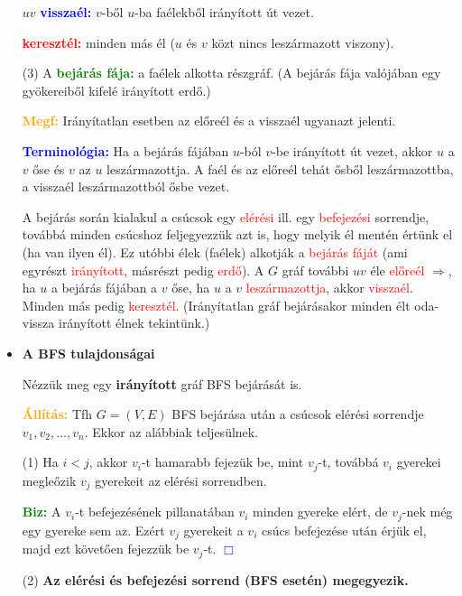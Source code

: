 \documentclass[../../szobeli.tex]{subfiles}
\begin{document}
\begin{itemize}
			$uv$ \textbf{\textcolor{blue}{visszaél:}} $v$-ből $u$-ba faélekből irányított út vezet.

			\textbf{\textcolor{red}{keresztél:}} minden más él ($u$ és $v$ közt nincs leszármazott viszony).

			(3) A \textbf{\textcolor{green}{bejárás fája:}} a faélek alkotta részgráf. (A bejárás fája valójában egy gyökereiből kifelé irányított erdő.)

			\textbf{\textcolor{orange}{Megf:}} Irányítatlan esetben az előreél és a visszaél ugyanazt jelenti.

			\textbf{\textcolor{blue}{Terminológia:}} Ha a bejárás fájában $u$-ból $v$-be irányított út vezet, akkor $u$ a $v$ őse és $v$ az $u$ leszármazottja. A faél és az előreél tehát ősből leszármazottba, a visszaél leszármazottból ősbe vezet.
            
            A bejárás során kialakul a csúcsok egy \textcolor{red}{elérési} ill. egy \textcolor{red}{befejezési} sorrendje, továbbá minden csúcshoz feljegyezzük azt is, hogy melyik él mentén értünk el (ha van ilyen él). Ez utóbbi élek ({faélek}) alkotják a \textcolor{red}{bejárás fáját} (ami egyrészt \textcolor{red}{irányított}, másrészt pedig \textcolor{red}{erdő}). A $G$ gráf további $uv$ éle \textcolor{red}{előreél} $\Rightarrow$, ha $u$ a bejárás fájában a $v$ őse, ha $u$ a $v$ \textcolor{red}{leszármazottja}, akkor \textcolor{red}{visszaél}. Minden más pedig \textcolor{red}{keresztél}. (Irányítatlan gráf bejárásakor minden élt oda-vissza irányított élnek tekintünk.)

        \item \textbf{A BFS tulajdonságai}
			
        Nézzük meg egy \textbf{irányított} gráf BFS bejárását is.

        \textbf{\textcolor{Orange}{Állítás:}} Tfh $G=(V,E)$ BFS bejárása után a csúcsok elérési sorrendje $v_1,v_2,\dots,v_n$. Ekkor az alábbiak teljesülnek.

        (1) Ha $i < j$, akkor $v_i$-t hamarabb fejezük be, mint $v_j$-t, továbbá $v_i$ gyerekei megleőzik $v_j$ gyerekeit az elérési sorrendben.

        \textbf{\textcolor{green}{Biz:}} A $v_i$-t befejezésének pillanatában $v_i$ minden gyereke elért, de $v_j$-nek még egy gyereke sem az. Ezért $v_j$ gyerekeit a $v_i$ csúcs befejezése után érjük el, majd ezt követően fejezzük be $v_j$-t.  \textcolor{blue}{$\Box$} 

        (2) \textbf{Az elérési és befejezési sorrend (BFS esetén) megegyezik.}


\end{itemize}
\end{document}
